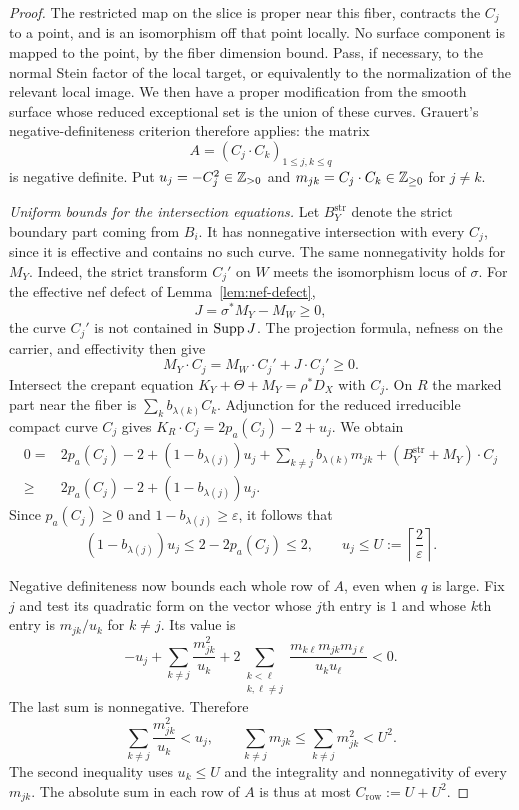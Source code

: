 \begin{proof}
The restricted map on the slice is proper near this fiber, contracts the
$C_j$ to a point, and is an isomorphism off that point locally.  No
surface component is mapped to the point, by the fiber dimension bound.
Pass, if necessary, to the normal Stein factor of the local target, or
equivalently to the normalization of the relevant local image.  We then
have a proper modification from the smooth surface whose reduced
exceptional set is the union of these curves.  Grauert's
negative-definiteness criterion
\cite[Section~4, no.~8(e), pp.~366--367]{Grauert1962} therefore applies:
the matrix
\[
                       A=(C_j\cdot C_k)_{1\leq j,k\leq q}
\]
is negative definite.  Put $u_j=-C_j^2\in\mathbb{Z}_{>0}$ and
$m_{jk}=C_j\cdot C_k\in\mathbb{Z}_{\geq0}$ for $j\ne k$.

\medskip\noindent\emph{Uniform bounds for the intersection equations.}
Let $B_Y^{\mathrm{str}}$ denote the strict boundary part coming from
$B_i$.  It has nonnegative intersection with every $C_j$, since it is
effective and contains no such curve.  The same nonnegativity holds for
$M_Y$.  Indeed, the strict transform $C_j'$ on $W$ meets the isomorphism
locus of $\sigma$.  For the effective nef defect of
Lemma~\ref{lem:nef-defect},
\[
                         J=\sigma^*M_Y-M_W\geq0,
\]
the curve $C_j'$ is not contained in $\operatorname{Supp} J$.  The projection formula,
nefness on the carrier, and effectivity then give
\[
                 M_Y\cdot C_j=M_W\cdot C_j'+J\cdot C_j'\geq0.
\]
Intersect the crepant equation
$K_Y+\Theta+M_Y=\rho^*D_X$ with $C_j$.  On $R$ the marked part near the
fiber is $\sum_k b_{\lambda(k)}C_k$.  Adjunction for the reduced
irreducible compact curve $C_j$ gives
$K_R\cdot C_j=2p_a(C_j)-2+u_j$.  We obtain
\begin{align*}
 0={}&2p_a(C_j)-2+(1-b_{\lambda(j)})u_j
       +\sum_{k\ne j}b_{\lambda(k)}m_{jk}
       +(B_Y^{\mathrm{str}}+M_Y)\cdot C_j\\
 \geq{}&2p_a(C_j)-2+(1-b_{\lambda(j)})u_j.
\end{align*}
Since $p_a(C_j)\geq0$ and
$1-b_{\lambda(j)}\geq\varepsilon$, it follows that
\begin{equation}\label{eq:surface-self-intersection-bound}
 (1-b_{\lambda(j)})u_j\leq2-2p_a(C_j)\leq2,
 \qquad u_j\leq U:=\left\lceil\frac2\varepsilon\right\rceil.
\end{equation}

Negative definiteness now bounds each whole row of $A$, even when $q$ is
large.  Fix $j$ and test its quadratic form on the vector whose $j$th
entry is $1$ and whose $k$th entry is $m_{jk}/u_k$ for $k\ne j$.  Its
value is
\[
 -u_j+\sum_{k\ne j}\frac{m_{jk}^2}{u_k}
 +2\sum_{\substack{k<\ell\\k,\ell\ne j}}
   \frac{m_{k\ell}m_{jk}m_{j\ell}}{u_ku_\ell}<0.
\]
The last sum is nonnegative.  Therefore
\begin{equation}\label{eq:surface-row-bound}
 \sum_{k\ne j}\frac{m_{jk}^2}{u_k}<u_j,
 \qquad
 \sum_{k\ne j}m_{jk}\leq\sum_{k\ne j}m_{jk}^2<U^2.
\end{equation}
The second inequality uses $u_k\leq U$ and the integrality and
nonnegativity of every $m_{jk}$.  The absolute sum in each row of $A$ is
thus at most $C_{\mathrm{row}}:=U+U^2$.


\end{proof}
